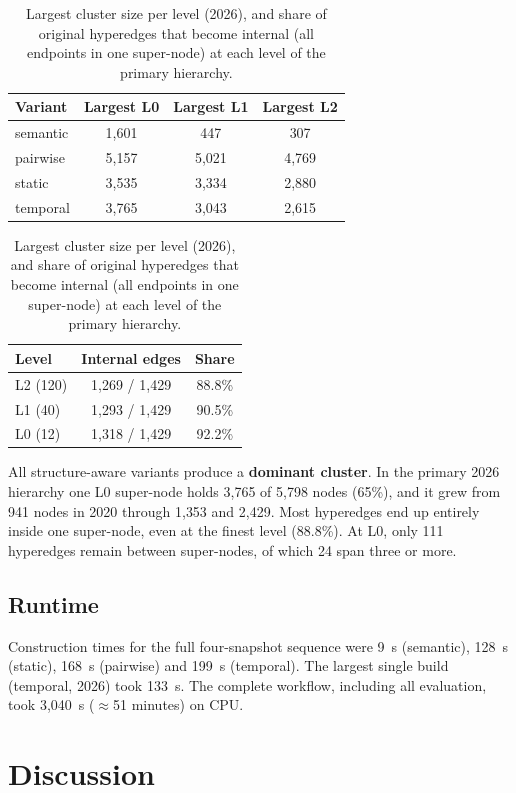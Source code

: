 \documentclass[11pt,a4paper]{article}
\theoremstyle{remark}
\begin{document}
\begin{table}[!htbp]
\centering
\caption{Largest cluster size per level (2026), and share of original hyperedges that become
internal (all endpoints in one super-node) at each level of the primary hierarchy.}
\label{tab:sizes}
\small
\begin{tabular}{lccc}
\toprule
Variant & Largest L0 & Largest L1 & Largest L2\\
\midrule
semantic & 1{,}601 & 447 & 307\\
pairwise & 5{,}157 & 5{,}021 & 4{,}769\\
static & 3{,}535 & 3{,}334 & 2{,}880\\
temporal & 3{,}765 & 3{,}043 & 2{,}615\\
\bottomrule
\end{tabular}
\hspace{0.6cm}
\begin{tabular}{lcc}
\toprule
Level & Internal edges & Share\\
\midrule
L2 (120) & 1{,}269 / 1{,}429 & 88.8\%\\
L1 (40) & 1{,}293 / 1{,}429 & 90.5\%\\
L0 (12) & 1{,}318 / 1{,}429 & 92.2\%\\
\bottomrule
\end{tabular}
\end{table}

All structure-aware variants produce a \textbf{dominant cluster}. In the primary 2026
hierarchy one L0 super-node holds 3{,}765 of 5{,}798 nodes (65\%), and it grew from 941 nodes
in 2020 through 1{,}353 and 2{,}429. Most hyperedges end up entirely inside one super-node,
even at the finest level (88.8\%). At L0, only 111 hyperedges remain between super-nodes, of
which 24 span three or more.

\subsection{Runtime}

Construction times for the full four-snapshot sequence were 9~s (semantic), 128~s (static),
168~s (pairwise) and 199~s (temporal). The largest single build (temporal, 2026) took 133~s.
The complete workflow, including all evaluation, took 3{,}040~s ($\approx$51 minutes) on CPU.

\section{Discussion}
\label{sec:discussion}
\end{document}
